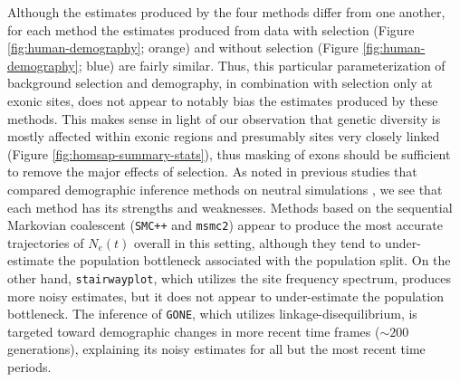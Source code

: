 \documentclass[hidelinks]{article}
\newcommand{\msmc}{\texttt{msmc2}\xspace}
\newcommand{\stairway}{\texttt{stairwayplot}\xspace}
\newcommand{\gone}{\texttt{GONE}\xspace}
\newcommand{\smcpp}{\texttt{SMC++}\xspace}
\begin{document}
    Although the estimates produced by the four methods differ from one another,
    for each method the estimates produced from data with selection (Figure
    \ref{fig:human-demography}; orange) and without selection (Figure
    \ref{fig:human-demography}; blue) are fairly similar.
    Thus, this particular parameterization of background selection and demography,
    in combination with selection only at exonic sites, %
    does not appear to notably bias the estimates produced by these methods.
    This makes sense in light of our observation that genetic diversity is mostly affected
    within exonic regions and presumably sites very closely linked (Figure \ref{fig:homsap-summary-stats}),
    thus masking of exons should be sufficient to remove the major effects of selection.
    As noted in previous studies that compared demographic inference methods
    on neutral simulations \citep{adrion2020community},
    we see that each method has its strengths and weaknesses.
    Methods based on the sequential Markovian coalescent (\smcpp and \msmc)
    appear to produce the most accurate trajectories of $N_e(t)$ overall
    in this setting, although they tend to under-estimate the population
    bottleneck associated with the population split.
    On the other hand, \stairway, which utilizes the site frequency spectrum,
    produces more noisy estimates,
    but it does not appear to under-estimate the population bottleneck.
    The inference of \gone, which utilizes linkage-disequilibrium,
    is targeted toward demographic changes in more recent time frames ($\sim 200$ generations),
    explaining its noisy estimates for all but the most recent time periods.
\end{document}
